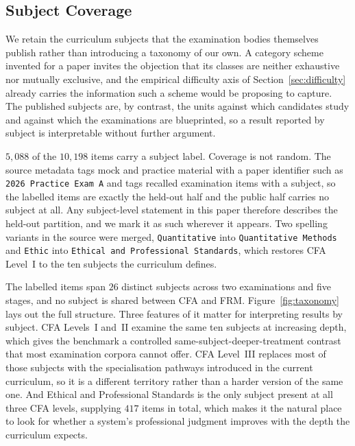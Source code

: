 
\subsection{Subject Coverage}
\label{sec:taxonomy}

We retain the curriculum subjects that the examination bodies themselves publish rather than
introducing a taxonomy of our own. A category scheme invented for a paper invites the objection
that its classes are neither exhaustive nor mutually exclusive, and the empirical difficulty
axis of Section~\ref{sec:difficulty} already carries the information such a scheme would be
proposing to capture. The published subjects are, by contrast, the units against which
candidates study and against which the examinations are blueprinted, so a result reported by
subject is interpretable without further argument.

$5{,}088$ of the $10{,}198$ items carry a subject label. Coverage is not random. The source
metadata tags mock and practice material with a paper identifier such as \texttt{2026 Practice
Exam A} and tags recalled examination items with a subject, so the labelled items are exactly
the held-out half and the public half carries no subject at all. Any subject-level statement in
this paper therefore describes the held-out partition, and we mark it as such wherever it
appears. Two spelling variants in the source were merged, \texttt{Quantitative} into
\texttt{Quantitative Methods} and \texttt{Ethic} into \texttt{Ethical and Professional
Standards}, which restores CFA Level~I to the ten subjects the curriculum defines.

The labelled items span $26$ distinct subjects across two examinations and five stages, and no
subject is shared between CFA and FRM. Figure~\ref{fig:taxonomy} lays out the full structure.
Three features of it matter for interpreting results by subject. CFA Levels~I and~II examine the
same ten subjects at increasing depth, which gives the benchmark a controlled
same-subject-deeper-treatment contrast that most examination corpora cannot offer. CFA Level~III
replaces most of those subjects with the specialisation pathways introduced in the current
curriculum, so it is a different territory rather than a harder version of the same one. And
Ethical and Professional Standards is the only subject present at all three CFA levels,
supplying $417$ items in total, which makes it the natural place to look for whether a system's
professional judgment improves with the depth the curriculum expects.

